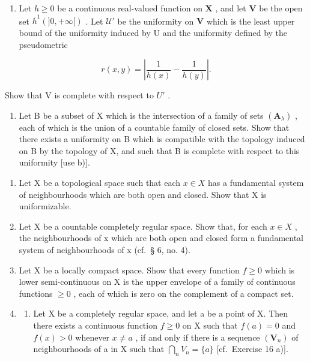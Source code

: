 \begin{enumerate}
\def\labelenumi{\alph{enumi})}
\setcounter{enumi}{1}
\tightlist
\item
  Let \(h \geqslant 0\) be a continuous real-valued function on \(\mathbf{X}\) , and let \(\mathbf{V}\) be the open set \(\overline{h}^{1}(]0, +\infty[)\) . Let \(\mathcal{U}'\) be the uniformity on \(\mathbf{V}\) which is the least upper bound of the uniformity induced by U and the uniformity defined by the pseudometric
\end{enumerate}

\[
r (x, y) = \left| \frac {\mathrm{1}}{h (x)} - \frac {\mathrm{1}}{h (y)} \right|.
\]

Show that V is complete with respect to \(U'\) .

\begin{enumerate}
\def\labelenumi{\alph{enumi})}
\setcounter{enumi}{2}
\tightlist
\item
  Let B be a subset of X which is the intersection of a family of sets \((\mathbf{A}_{\lambda})\) , each of which is the union of a countable family of closed sets. Show that there exists a uniformity on B which is compatible with the topology induced on B by the topology of X, and such that B is complete with respect to this uniformity {[}use b){]}.
\end{enumerate}

\begin{enumerate}
\def\labelenumi{\arabic{enumi})}
\setcounter{enumi}{16}
\item
  Let X be a topological space such that each \(x \in X\) has a fundamental system of neighbourhoods which are both open and closed. Show that X is uniformizable.
\item
  Let X be a countable completely regular space. Show that, for each \(x \in X\) , the neighbourhoods of x which are both open and closed form a fundamental system of neighbourhoods of x (cf.~§ 6, no. 4).
\item
  Let X be a locally compact space. Show that every function \(f \geqslant 0\) which is lower semi-continuous on X is the upper envelope of a family of continuous functions \(\geqslant 0\) , each of which is zero on the complement of a compact set.
\item
  \begin{enumerate}
  \def\labelenumii{\alph{enumii})}
  \tightlist
  \item
    Let X be a completely regular space, and let a be a point of X. Then there exists a continuous function \(f \geqslant 0\) on X such that \(f(a) = 0\) and \(f(x) > 0\) whenever \(x \neq a\) , if and only if there is a sequence \((\mathbf{V}_n)\) of neighbourhoods of a in X such that \(\bigcap_{n} V_n = \{a\}\) {[}cf.~Exercise 16 a){]}.
  \end{enumerate}
\end{enumerate}

